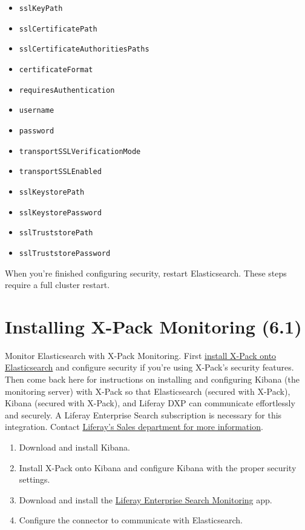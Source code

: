 \begin{itemize}
\tightlist
\item
  \texttt{sslKeyPath}
\item
  \texttt{sslCertificatePath}
\item
  \texttt{sslCertificateAuthoritiesPaths}
\item
  \texttt{certificateFormat}
\item
  \texttt{requiresAuthentication}
\item
  \texttt{username}
\item
  \texttt{password}
\item
  \texttt{transportSSLVerificationMode}
\item
  \texttt{transportSSLEnabled}
\item
  \texttt{sslKeystorePath}
\item
  \texttt{sslKeystorePassword}
\item
  \texttt{sslTruststorePath}
\item
  \texttt{sslTruststorePassword}
\end{itemize}

When you're finished configuring security, restart Elasticsearch. These
steps require a full cluster restart.

\section{Installing X-Pack Monitoring
(6.1)}\label{installing-x-pack-monitoring-6.1}

Monitor Elasticsearch with X-Pack Monitoring. First
\href{discover/deployment/-/knowledge_base-7-1/installing-x-pack}{install
X-Pack onto Elasticsearch} and configure security if you're using
X-Pack's security features. Then come back here for instructions on
installing and configuring Kibana (the monitoring server) with X-Pack so
that Elasticsearch (secured with X-Pack), Kibana (secured with X-Pack),
and Liferay DXP can communicate effortlessly and securely. A Liferay
Enterprise Search subscription is necessary for this integration.
Contact
\href{https://www.liferay.com/contact-us\#contact-sales}{Liferay's Sales
department for more information}.

\begin{enumerate}
\def\labelenumi{\arabic{enumi}.}
\item
  Download and install Kibana.
\item
  Install X-Pack onto Kibana and configure Kibana with the proper
  security settings.
\item
  Download and install the
  \href{https://www.liferay.com/marketplace}{Liferay Enterprise Search
  Monitoring} app.
\item
  Configure the connector to communicate with Elasticsearch.
\end{enumerate}

